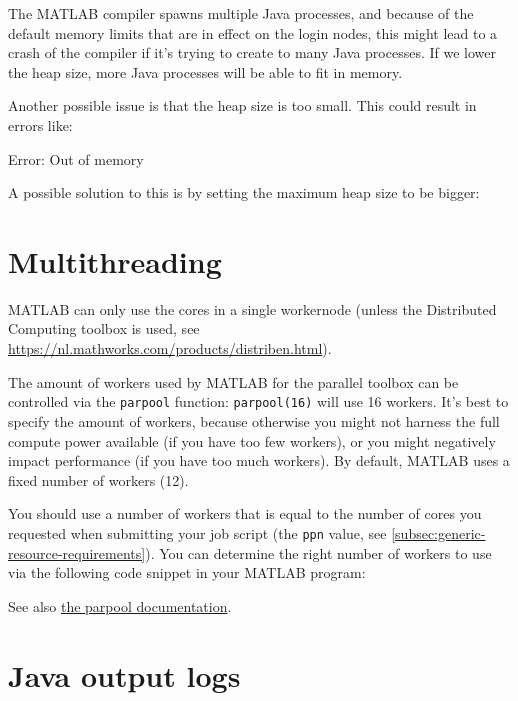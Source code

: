 The MATLAB compiler spawns multiple Java processes, and because of the default memory
limits that are in effect on the login nodes, this might lead to a crash of the compiler
if it's trying to create to many Java processes. If we lower the heap size, more
Java processes will be able to fit in memory.

Another possible issue is that the heap size is too small. This could result
in errors like:

\begin{prompt}
Error: Out of memory
\end{prompt}

A possible solution to this is by setting the maximum heap size to be bigger:

\begin{prompt}
\end{prompt}

\section{Multithreading}

MATLAB can only use the cores in a single
workernode (unless the Distributed Computing toolbox is used, see
\url{https://nl.mathworks.com/products/distriben.html}).


The amount of workers used by MATLAB for the parallel toolbox can be controlled
via the \lstinline|parpool| function: \lstinline|parpool(16)| will use 16 workers.
It's best to specify the amount of workers,
because otherwise you might not harness the full compute power available (if you have
too few workers), or you might negatively impact performance (if you have too much workers).
By default, MATLAB uses a fixed number of workers (12).

You should use a number of workers that is equal to the number of cores you requested
when submitting your job script (the \lstinline|ppn| value, see \autoref{subsec:generic-resource-requirements}).
You can determine the right number of workers to use via the following code snippet in your MATLAB program:



See also \href{https://nl.mathworks.com/help/distcomp/parpool.html}{the parpool documentation}.


\section{Java output logs}

